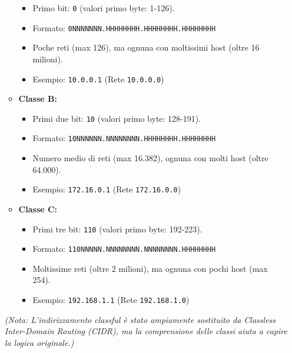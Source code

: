 \documentclass{article}
\begin{document}
\begin{itemize}
\begin{itemize}
        \begin{itemize}
            \item Primo bit: \texttt{0} (valori primo byte: 1-126).
            \item Formato: \texttt{0NNNNNNN.HHHHHHHH.HHHHHHHH.HHHHHHHH}
            \item Poche reti (max 126), ma ognuna con moltissimi host (oltre 16 milioni).
            \item Esempio: \texttt{10.0.0.1} (Rete \texttt{10.0.0.0})
        \end{itemize}
        \item \textbf{Classe B:}
        \begin{itemize}
            \item Primi due bit: \texttt{10} (valori primo byte: 128-191).
            \item Formato: \texttt{10NNNNNN.NNNNNNNN.HHHHHHHH.HHHHHHHH}
            \item Numero medio di reti (max 16.382), ognuna con molti host (oltre 64.000).
            \item Esempio: \texttt{172.16.0.1} (Rete \texttt{172.16.0.0})
        \end{itemize}
        \item \textbf{Classe C:}
        \begin{itemize}
            \item Primi tre bit: \texttt{110} (valori primo byte: 192-223).
            \item Formato: \texttt{110NNNNN.NNNNNNNN.NNNNNNNN.HHHHHHHH}
            \item Moltissime reti (oltre 2 milioni), ma ognuna con pochi host (max 254).
            \item Esempio: \texttt{192.168.1.1} (Rete \texttt{192.168.1.0})
        \end{itemize}
    \end{itemize}
    \textit{(Nota: L'indirizzamento classful è stato ampiamente sostituito da Classless Inter-Domain Routing (CIDR), ma la comprensione delle classi aiuta a capire la logica originale.)}
\end{itemize}
\end{document}
